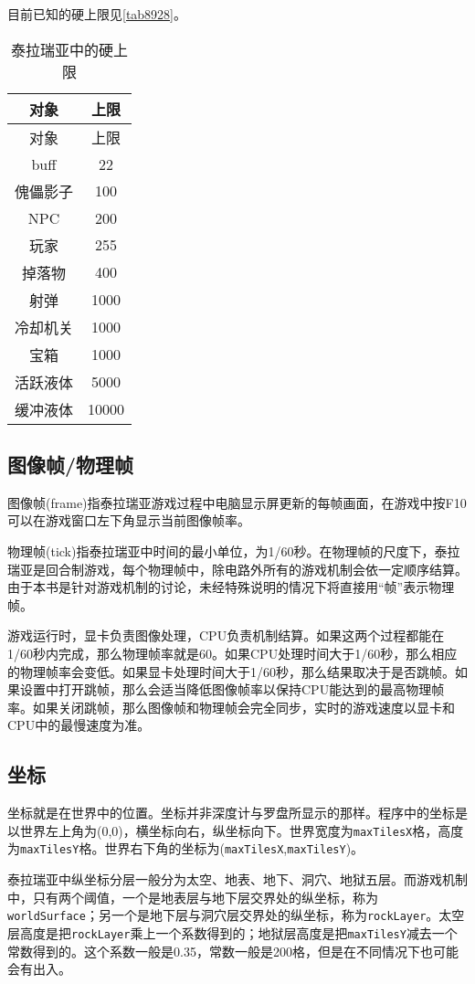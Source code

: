目前已知的硬上限见\autoref{tab8928}。
\begin{longtable}{|c|c|}
\caption{泰拉瑞亚中的硬上限}\label{tab8928}\\\hline
对象&上限\\\hline
\endfirsthead
\hline 对象&上限\\\hline
\endhead
\hline
\endfoot
buff&22\\\hline
傀儡影子&100\\\hline
NPC&200\\\hline
玩家&255\\\hline
掉落物&400\\\hline
射弹&1000\\\hline
冷却机关&1000\\\hline
宝箱&1000\\\hline
活跃液体&5000\\\hline
缓冲液体&10000
\end{longtable}

\subsection{图像帧/物理帧}

图像帧(frame)指泰拉瑞亚游戏过程中电脑显示屏更新的每帧画面，在游戏中按F10可以在游戏窗口左下角显示当前图像帧率。

物理帧(tick)指泰拉瑞亚中时间的最小单位，为1/60秒。在物理帧的尺度下，泰拉瑞亚是回合制游戏，每个物理帧中，除电路外所有的游戏机制会依一定顺序结算。由于本书是针对游戏机制的讨论，未经特殊说明的情况下将直接用“帧”表示物理帧。

游戏运行时，显卡负责图像处理，CPU负责机制结算。如果这两个过程都能在1/60秒内完成，那么物理帧率就是60。如果CPU处理时间大于1/60秒，那么相应的物理帧率会变低。如果显卡处理时间大于1/60秒，那么结果取决于是否跳帧。如果设置中打开跳帧，那么会适当降低图像帧率以保持CPU能达到的最高物理帧率。如果关闭跳帧，那么图像帧和物理帧会完全同步，实时的游戏速度以显卡和CPU中的最慢速度为准。

\subsection{坐标}\label{tab8}
坐标就是在世界中的位置。坐标并非深度计与罗盘所显示的那样。程序中的坐标是以世界左上角为(0,0)，横坐标向右，纵坐标向下。世界宽度为\lstinline{maxTilesX}格，高度为\lstinline{maxTilesY}格。世界右下角的坐标为(\lstinline{maxTilesX},\lstinline{maxTilesY})。

泰拉瑞亚中纵坐标分层一般分为太空、地表、地下、洞穴、地狱五层。而游戏机制中，只有两个阈值，一个是地表层与地下层交界处的纵坐标，称为\lstinline{worldSurface}；另一个是地下层与洞穴层交界处的纵坐标，称为\lstinline{rockLayer}。太空层高度是把\lstinline{rockLayer}乘上一个系数得到的；地狱层高度是把\lstinline{maxTilesY}减去一个常数得到的。这个系数一般是0.35，常数一般是200格，但是在不同情况下也可能会有出入。

